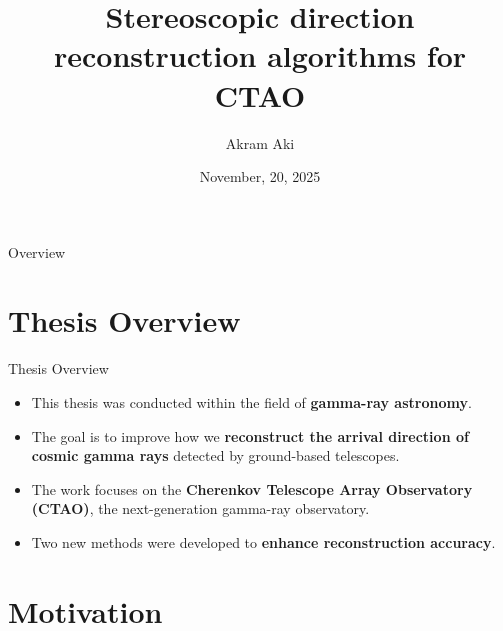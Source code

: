 \documentclass[aspectratio=1610, 9pt]{beamer}
\title{Stereoscopic direction reconstruction algorithms for CTAO}
\author[A.~Aki]{Akram Aki}
\date{November, 20, 2025}
\institute[Elsässer/Rhode]{Working Group Elsässer/Rhode}
\begin{document}
\maketitle

\begin{frame}{Overview}
  \tableofcontents
\end{frame}

\section{Thesis Overview}
\begin{frame}{Thesis Overview}
  \begin{itemize}
    \setlength{\itemsep}{0.7cm} %
    \item This thesis was conducted within the field of \textbf{gamma-ray astronomy}.  
    \item The goal is to improve how we \textbf{reconstruct the arrival direction of cosmic gamma rays} detected by ground-based telescopes.  
    \item The work focuses on the \textbf{Cherenkov Telescope Array Observatory (CTAO)}, the next-generation gamma-ray observatory.  
    \item Two new methods were developed to \textbf{enhance reconstruction accuracy}.  
  \end{itemize}
\end{frame}

%



\section{Motivation}
\end{document}
